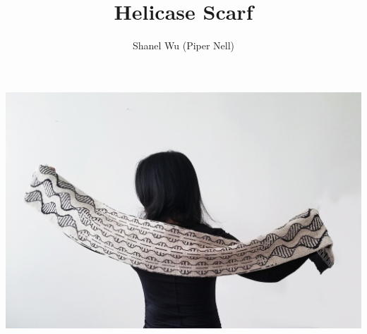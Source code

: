 \documentclass[12pt]{article}
\title{Helicase Scarf}
\author{Shanel Wu (Piper Nell)}
\begin{document}
\includegraphics[width=\linewidth]{spread-small.jpg}
\vspace{1em}

{\selectfont
\HUGE\textbf{\thetitle}
\hspace{3em} %
\normalsize\theauthor
}
\end{document}

